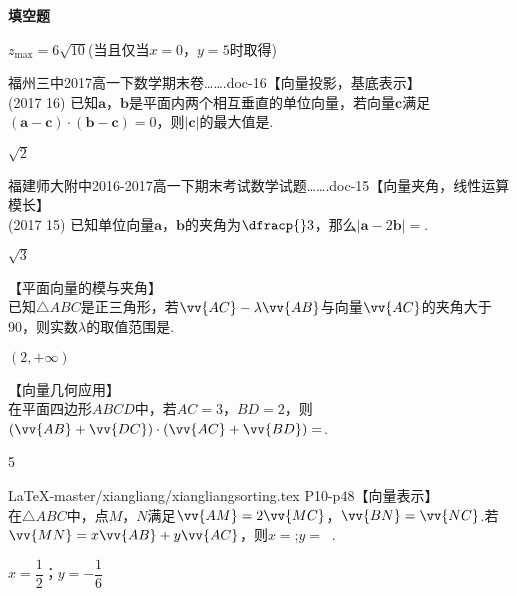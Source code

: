 \begin{exercise}{\bf 填空题}
      \begin{answer}
        $z_{\max}=6\sqrt{10}$(当且仅当$x=0$，$y=5$时取得)
      \end{answer}
    \item 福州三中2017高一下数学期末卷…….doc-16【向量投影，基底表示】\\
     (2017  16)
     已知$\bm a$，$\bm b$是平面内两个相互垂直的单位向量，若向量$\bm c$满足$(\bm a-\bm c)\cdot(\bm b-\bm c)=0$，则$|\bm c|$的最大值是\tk.
     \begin{answer}
       $\sqrt2$
     \end{answer}
    \item 福建师大附中2016-2017高一下期末考试数学试题…….doc-15【向量夹角，线性运算模长】\\
     (2017  15)
     已知单位向量$\bm a$，$\bm b$的夹角为$\dfracp{}3$，那么$|\bm a-2\bm b|=$\tk.
     \begin{answer}
       $\sqrt3$
     \end{answer}
    \item 【平面向量的模与夹角】\\
     已知$\triangle{ABC}$是正三角形，若$\vv{AC}-\lambda\vv{AB}$与向量$\vv{AC}$的夹角大于90\degree，则实数$\lambda$的取值范围是\tk.
     \begin{answer}
       $(2,+\infty)$
     \end{answer}
    \item 【向量几何应用】\\
     在平面四边形$ABCD$中，若$AC=3$，$BD=2$，则$(\vv{AB}+\vv{DC})\cdot(\vv{AC}+\vv{BD})=$\tk.
     \begin{answer}
       5
     \end{answer}
    \newline
    {\begin{minipage}[b]{0.65\linewidth}
      \item LaTeX-master/xiangliang/xiangliangsorting.tex P10-p48【向量表示】\\
      在$\triangle ABC$中，点$ M$，$N $满足$ \vv{AM}=2\vv{MC}$，$\vv{BN}=\vv{NC}$.若$\vv{MN}=x\vv{AB}+y\vv{AC}$，则$ x= $\tk;$ y= ~$ \tk.
      \begin{answer}
        $x=\dfrac12$；$y=-\dfrac16$
      \end{answer}
     \end{minipage}
     \begin{minipage}[htbp!]{0.3\linewidth}
       \begin{center}
       \begin{tikzpicture}

\end{tikzpicture}
\end{center}
\end{minipage}}
\end{exercise}
